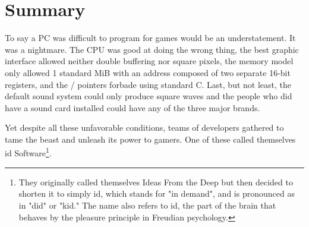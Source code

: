 \documentclass[book.tex]{subfiles}
\begin{document}
\section{Summary}
To say a PC was difficult to program for games would be an understatement. It was a nightmare. The CPU was good at doing the wrong thing, the best graphic interface allowed neither double buffering nor square pixels, the memory model only allowed 1 standard MiB with an address composed of two separate 16-bit registers, and the / pointers forbade using standard C. Last, but not least, the default sound system could only produce square waves and the people who did have a sound card installed could have any of the three major brands.\\
\par
Yet despite all these unfavorable conditions, teams of developers gathered to tame the beast and unleash its power to gamers. One of these called themselves id Software\footnote{They originally called themselves Ideas From the Deep but then decided to shorten it to simply id, which stands for "in demand", and is pronounced as in "did" or "kid." The name also refers to id, the part of the brain that behaves by the pleasure principle in Freudian psychology.}.
\end{document}

